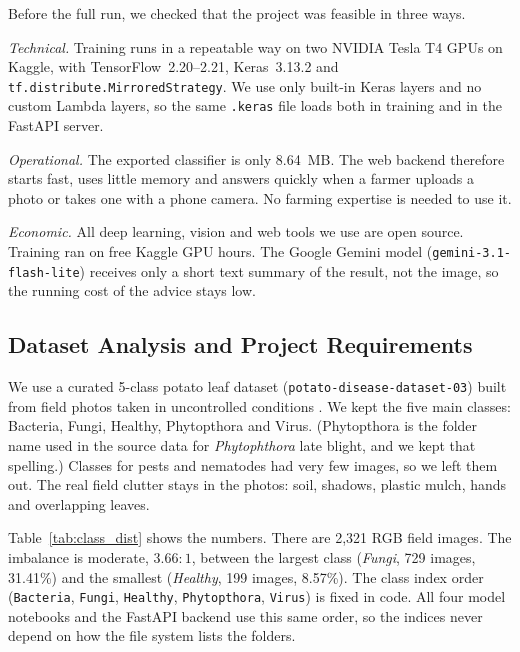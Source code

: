Before the full run, we checked that the project was feasible in three ways.

\textit{Technical.} Training runs in a repeatable way on two NVIDIA Tesla T4 GPUs on Kaggle, with TensorFlow~2.20--2.21, Keras~3.13.2 \cite{abadi2016tensorflow} and \texttt{tf.distribute.\allowbreak MirroredStrategy}. We use only built-in Keras layers and no custom Lambda layers, so the same \texttt{.keras} file loads both in training and in the FastAPI server.

\textit{Operational.} The exported classifier is only 8.64~MB. The web backend therefore starts fast, uses little memory and answers quickly when a farmer uploads a photo or takes one with a phone camera. No farming expertise is needed to use it.

\textit{Economic.} All deep learning, vision and web tools we use are open source. Training ran on free Kaggle GPU hours. The Google Gemini model (\texttt{gemini-3.1-\allowbreak flash-lite}) receives only a short text summary of the result, not the image, so the running cost of the advice stays low.

\subsection{Dataset Analysis and Project Requirements}
We use a curated 5-class potato leaf dataset (\texttt{potato-disease-dataset-03}) built from field photos taken in uncontrolled conditions \cite{shabrina2024novel}. We kept the five main classes: Bacteria, Fungi, Healthy, Phytopthora and Virus. (Phytopthora is the folder name used in the source data for \textit{Phytophthora} late blight, and we kept that spelling.) Classes for pests and nematodes had very few images, so we left them out. The real field clutter stays in the photos: soil, shadows, plastic mulch, hands and overlapping leaves.

Table~\ref{tab:class_dist} shows the numbers. There are 2,321 RGB field images. The imbalance is moderate, $3.66:1$, between the largest class (\textit{Fungi}, 729 images, 31.41\%) and the smallest (\textit{Healthy}, 199 images, 8.57\%). The class index order (\texttt{Bacteria}, \texttt{Fungi}, \texttt{Healthy}, \texttt{Phytopthora}, \texttt{Virus}) is fixed in code. All four model notebooks and the FastAPI backend use this same order, so the indices never depend on how the file system lists the folders.

